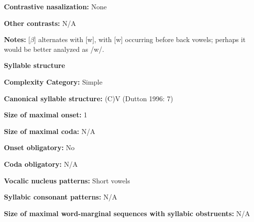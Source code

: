\begin{styleBody}
\textbf{Contrastive nasalization:} None
\end{styleBody}

\begin{styleBody}
\textbf{Other contrasts:} N/A
\end{styleBody}

\begin{styleBody}
\textbf{Notes:} [$\beta $] alternates with [w], with [w] occurring before back vowels; perhaps it would be better analyzed as /w/.
\end{styleBody}

\begin{styleBody}
\textbf{Syllable structure}
\end{styleBody}

\begin{styleBody}
\textbf{Complexity Category:} Simple
\end{styleBody}

\begin{styleBody}
\textbf{Canonical syllable structure:} (C)V\textbf{ }(Dutton 1996: 7)
\end{styleBody}

\begin{styleBody}
\textbf{Size of maximal onset:} 1
\end{styleBody}

\begin{styleBody}
\textbf{Size of maximal coda:} N/A
\end{styleBody}

\begin{styleBody}
\textbf{Onset obligatory:} No
\end{styleBody}

\begin{styleBody}
\textbf{Coda obligatory:} N/A
\end{styleBody}

\begin{styleBody}
\textbf{Vocalic nucleus patterns:} Short vowels
\end{styleBody}

\begin{styleBody}
\textbf{Syllabic consonant patterns:} N/A
\end{styleBody}

\begin{styleBody}
\textbf{Size of maximal word{}-marginal sequences with syllabic obstruents:} N/A
\end{styleBody}

